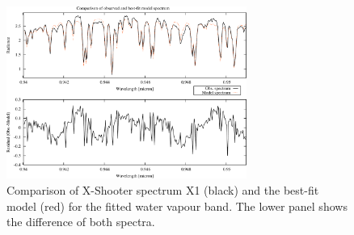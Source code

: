 \begin{figure}
\centering
\includegraphics[width=0.7\textwidth,clip=true]
{figures/molecfit_xshoo_vis_1_fit_2.pdf}
\caption[]{Comparison of X-Shooter spectrum X1 (black) and the best-fit model
(red) for the fitted water vapour band. The lower panel shows the difference of
both spectra.}
\label{fig:xshooter}
\end{figure}

